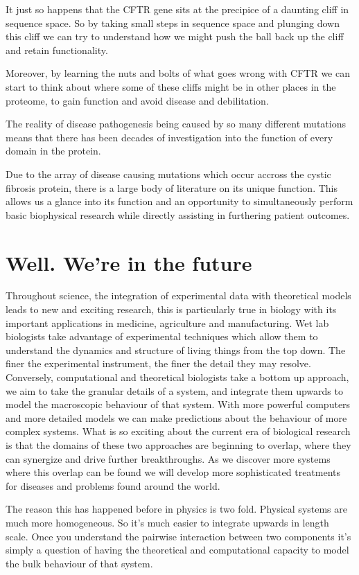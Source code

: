It just so happens that the CFTR gene sits at the precipice of a daunting cliff in sequence space. So by taking small steps in sequence space and plunging down this cliff we can try to understand how we might push the ball back up the cliff and retain functionality.

Moreover, by learning the nuts and bolts of what goes wrong with CFTR we can start to think about where some of these cliffs might be in other places in the proteome, to gain function and avoid disease and debilitation.

The reality of disease pathogenesis being caused by so many different mutations means that there has been decades of investigation into the function of every domain in the protein. 

Due to the array of disease causing mutations which occur accross the cystic fibrosis protein, there is a large body of literature on its unique function. This allows us a glance into its function and an opportunity to simultaneously perform basic biophysical research while directly assisting in furthering patient outcomes.  

\section{Well. We're in the future}
Throughout science, the integration of experimental data with theoretical models leads to new and exciting research, this is particularly true in biology with its important applications in medicine, agriculture and manufacturing. Wet lab biologists take advantage of experimental techniques which allow them to understand the dynamics and structure of living things from the top down. The finer the experimental instrument, the finer the detail they may resolve. Conversely, computational and theoretical biologists take a bottom up approach, we aim to take the granular details of a system, and integrate them upwards to model the macroscopic behaviour of that system. With more powerful computers and more detailed models we can make predictions about the behaviour of more complex systems. What is so exciting about the current era of biological research is that the domains of these two approaches are beginning to overlap, where they can synergize  and drive further breakthroughs. As we discover more systems where this overlap can be found we will develop more sophisticated treatments for diseases and problems found around the world.

The reason this has happened before in physics is two fold. Physical systems are much more homogeneous. So it's much easier to integrate upwards in length scale. Once you understand the pairwise interaction between two components it's simply a question of having the theoretical and computational capacity to model the bulk behaviour of that system. 

